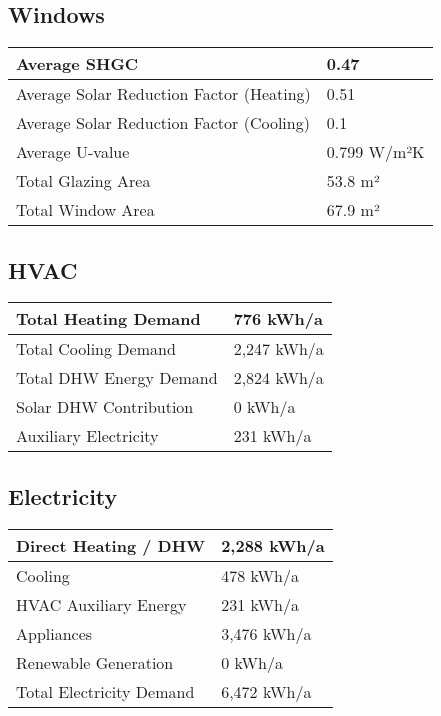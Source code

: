 \documentclass{article}
\begin{document}
\subsection*{Windows}

\begin{tabular}{|l|l|}
    \hline
    Average SHGC & 0.47 \\
    \hline
    Average Solar Reduction Factor (Heating) & 0.51 \\
    \hline
    Average Solar Reduction Factor (Cooling) & 0.1 \\
    \hline
    Average U-value & 0.799 W/m²K \\
    \hline
    Total Glazing Area & 53.8 m² \\
    \hline
    Total Window Area & 67.9 m² \\
    \hline
\end{tabular}

\vspace{1cm}

\subsection*{HVAC}

\begin{tabular}{|l|l|}
    \hline
    Total Heating Demand & 776 kWh/a \\
    \hline
    Total Cooling Demand & 2,247 kWh/a \\
    \hline
    Total DHW Energy Demand & 2,824 kWh/a \\
    \hline
    Solar DHW Contribution & 0 kWh/a \\
    \hline
    Auxiliary Electricity & 231 kWh/a \\
    \hline
\end{tabular}

\vspace{1cm}

\subsection*{Electricity}

\begin{tabular}{|l|l|}
    \hline
    Direct Heating / DHW & 2,288 kWh/a \\
    \hline
    Cooling & 478 kWh/a \\
    \hline
    HVAC Auxiliary Energy & 231 kWh/a \\
    \hline
    Appliances & 3,476 kWh/a \\
    \hline
    Renewable Generation & 0 kWh/a \\
    \hline
    Total Electricity Demand & 6,472 kWh/a \\
    \hline
\end{tabular}
\end{document}
